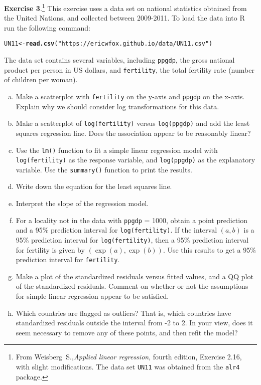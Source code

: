 \documentclass[11pt]{article}\usepackage[]{graphicx}\usepackage[]{color}
\makeatletter
\newcommand{\hlstr}[1]{\textcolor[rgb]{0.192,0.494,0.8}{#1}}%
\newcommand{\hlstd}[1]{\textcolor[rgb]{0.345,0.345,0.345}{#1}}%
\newcommand{\hlkwb}[1]{\textcolor[rgb]{0.69,0.353,0.396}{#1}}%
\newcommand{\hlkwd}[1]{\textcolor[rgb]{0.737,0.353,0.396}{\textbf{#1}}}%
\newenvironment{kframe}{%
 \def\at@end@of@kframe{}%
 \ifinner\ifhmode%
  \def\at@end@of@kframe{\end{minipage}}%
  \begin{minipage}{\columnwidth}%
 \fi\fi%
 \def\FrameCommand##1{\hskip\@totalleftmargin \hskip-\fboxsep
 \colorbox{shadecolor}{##1}\hskip-\fboxsep
     \hskip-\linewidth \hskip-\@totalleftmargin \hskip\columnwidth}%
 \MakeFramed {\advance\hsize-\width
   \@totalleftmargin\z@ \linewidth\hsize
   \@setminipage}}%
 {\par\unskip\endMakeFramed%
 \at@end@of@kframe}
\newenvironment{knitrout}{}{} %
\makeatother
\begin{document}
\textbf{Exercise 3}.\footnote{From Weisberg~S.,\emph{Applied linear regression}, fourth edition, Exercise 2.16, with slight modifications.  The data set \texttt{UN11} was obtained from the \texttt{alr4} package.}  This exercise uses a data set on national statistics obtained from the United Nations, and collected between 2009-2011.  To load the data into R run the following command:
\begin{knitrout}
\color{fgcolor}\begin{kframe}
\begin{alltt}
\hlstd{UN11} \hlkwb{<-} \hlkwd{read.csv}\hlstd{(}\hlstr{"https://ericwfox.github.io/data/UN11.csv"}\hlstd{)}
\end{alltt}
\end{kframe}
\end{knitrout}
The data set contains several variables, including \texttt{ppgdp}, the gross national product per person in US dollars, and \texttt{fertility}, the total fertility rate (number of children per woman).
\begin{enumerate}[(a)]
\item Make a scatterplot with \texttt{fertility} on the y-axis and \texttt{ppgdp} on the x-axis.  Explain why we should consider log transformations for this data.
\item Make a scatterplot of \texttt{log(fertility)} versus \texttt{log(ppgdp)} and add the least squares regression line.  Does the association appear to be reasonably linear? 
\item Use the \texttt{lm()} function to fit a simple linear regression model with \texttt{log(fertility)} as the response variable, and \texttt{log(ppgdp)} as the explanatory variable.  Use the \texttt{summary()} function to print the results.
\item Write down the equation for the least squares line.
\item Interpret the slope of the regression model.
\item For a locality not in the data with \texttt{ppgdp} = 1000, obtain a point prediction and a 95\% prediction interval for \texttt{log(fertility)}.  If the interval $(a,b)$ is a 95\% prediction interval for \texttt{log(fertility)}, then a 95\% prediction interval for fertility is given by $(\exp(a), \exp(b))$.  Use this results to get a 95\% prediction interval for \texttt{fertility}.
\item Make a plot of the standardized residuals versus fitted values, and a QQ plot of the standardized residuals.  Comment on whether or not the assumptions for simple linear regression appear to be satisfied.
\item Which countries are flagged as outliers?  That is, which countries have standardized residuals outside the interval from -2 to 2.  In your view, does it seem necessary to remove any of these points, and then refit the model?\\
\end{enumerate}
\end{document}
